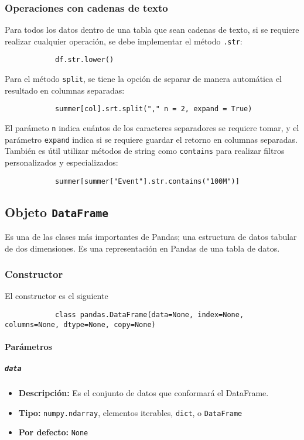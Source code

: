 \subsubsection{Operaciones con cadenas de texto}
Para todos los datos dentro de una tabla que sean cadenas de texto, si se
requiere realizar cualquier operación, se debe implementar el método
\texttt{.str}:
\begin{verbatim}
            df.str.lower()
            \end{verbatim}
Para el método \texttt{split}, se tiene la opción de separar de manera
automática el resultado en columnas separadas:
\begin{verbatim}
            summer[col].srt.split("," n = 2, expand = True)
            \end{verbatim}
El parámeto \texttt{n} indica cuántos de los caracteres separadores se requiere
tomar, y el parámetro \texttt{expand} indica si se requiere guardar el retorno
en columnas separadas. \\
También es útil utilizar métodos de string como \texttt{contains} para realizar
filtros personalizados y especializados:
\begin{verbatim}
            summer[summer["Event"].str.contains("100M")]
            \end{verbatim}

\subsection{Objeto \texttt{DataFrame}}

Es una de las clases más importantes de Pandas; una estructura de datos tabular
de dos dimensiones. Es una representación en Pandas de una tabla de datos.

\subsubsection{Constructor} El constructor es el siguiente

\begin{verbatim}
            class pandas.DataFrame(data=None, index=None, columns=None, dtype=None, copy=None)
            \end{verbatim}
\paragraph{Parámetros}

\subparagraph{\texttt{data}}
\begin{itemize}
    \item \textbf{Descripción:} Es el conjunto de datos que conformará el
          DataFrame.
    \item \textbf{Tipo:} \texttt{numpy.ndarray}, elementos iterables,
          \texttt{dict}, o \texttt{DataFrame}
    \item \textbf{Por defecto:} \texttt{None}
\end{itemize}

